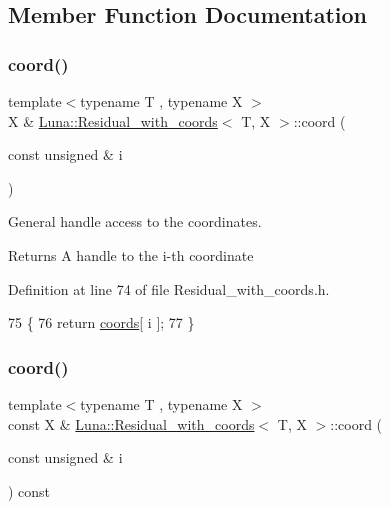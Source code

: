 \subsection{Member Function Documentation}
\mbox{\label{classLuna_1_1Residual__with__coords_a3fa4c950a944743c0380e4c151728372}} 
\subsubsection{\texorpdfstring{coord()}{coord()}\hspace{0.1cm}{\footnotesize\ttfamily [1/2]}}
{\footnotesize\ttfamily template$<$typename T , typename X $>$ \\
X \& \hyperlink{classLuna_1_1Residual__with__coords}{Luna\+::\+Residual\+\_\+with\+\_\+coords}$<$ T, X $>$\+::coord (\begin{DoxyParamCaption}\item[{const unsigned \&}]{i }\end{DoxyParamCaption})\hspace{0.3cm}{\ttfamily [inline]}}



General handle access to the coordinates. 

\begin{DoxyReturn}{Returns}
A handle to the i-\/th coordinate 
\end{DoxyReturn}


Definition at line 74 of file Residual\+\_\+with\+\_\+coords.\+h.


\begin{DoxyCode}
75   \{
76     \textcolor{keywordflow}{return} \hyperlink{classLuna_1_1Residual__with__coords_a3f69e7026c7f86e14bc94ededc86ee62}{coords}[ i ];
77   \}
\end{DoxyCode}
\mbox{\label{classLuna_1_1Residual__with__coords_a6fca44ee46cbe0fee796f3d0cf43f74e}} 
\subsubsection{\texorpdfstring{coord()}{coord()}\hspace{0.1cm}{\footnotesize\ttfamily [2/2]}}
{\footnotesize\ttfamily template$<$typename T , typename X $>$ \\
const X \& \hyperlink{classLuna_1_1Residual__with__coords}{Luna\+::\+Residual\+\_\+with\+\_\+coords}$<$ T, X $>$\+::coord (\begin{DoxyParamCaption}\item[{const unsigned \&}]{i }\end{DoxyParamCaption}) const\hspace{0.3cm}{\ttfamily [inline]}}



